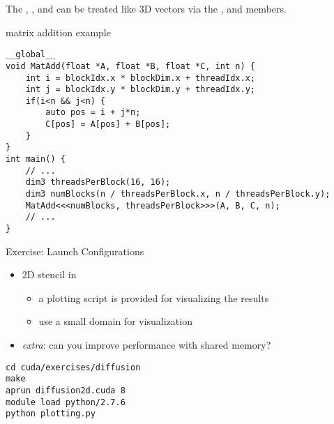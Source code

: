 \begin{frame}[fragile]{}

    The , ,  and  can be treated like 3D vectors via the ,  and  members.
    \begin{code}{matrix addition example}
        \begin{lstlisting}[style=boxcudatiny]
__global__
void MatAdd(float *A, float *B, float *C, int n) {
    int i = blockIdx.x * blockDim.x + threadIdx.x;
    int j = blockIdx.y * blockDim.y + threadIdx.y;
    if(i<n && j<n) {
        auto pos = i + j*n;
        C[pos] = A[pos] + B[pos];
    }
}
int main() {
    // ...
    dim3 threadsPerBlock(16, 16);
    dim3 numBlocks(n / threadsPerBlock.x, n / threadsPerBlock.y);
    MatAdd<<<numBlocks, threadsPerBlock>>>(A, B, C, n);
    // ...
}
        \end{lstlisting}
   \end{code}

\end{frame}

\begin{frame}[fragile]{Exercise: Launch Configurations}
    \begin{itemize}
        \item 2D stencil in 
        \begin{itemize}
            \item a plotting script is provided for visualizing the results
            \item use a small domain for visualization
        \end{itemize}
        \item \emph{extra}: can you improve performance with shared memory?
    \end{itemize}

    \begin{code}{}
        \begin{lstlisting}[style=boxcudatiny]
cd cuda/exercises/diffusion
make
aprun diffusion2d.cuda 8
module load python/2.7.6
python plotting.py
        \end{lstlisting}
   \end{code}

\end{frame}

